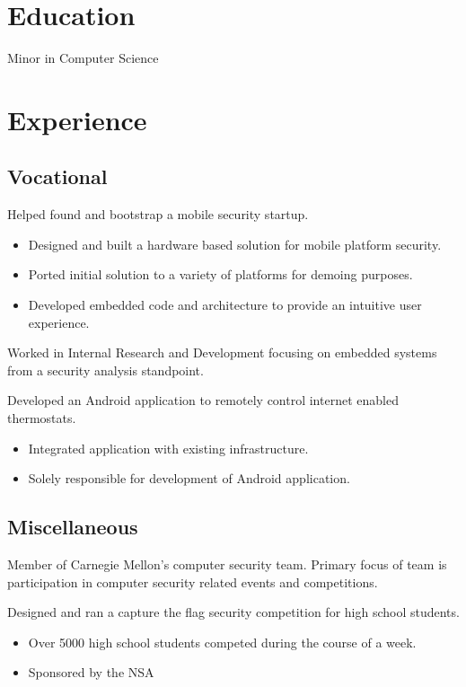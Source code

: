 \documentclass[10pt,a4paper,sans]{moderncv}
\begin{document}
\makecvtitle

\section{Education}
{Minor in Computer Science}

\section{Experience}
\subsection{Vocational}
{Helped found and bootstrap a mobile security startup.
\begin{itemize}
\item Designed and built a hardware based solution for mobile platform security.
\item Ported initial solution to a variety of platforms for demoing purposes.
\item Developed embedded code and architecture to provide an intuitive user experience.
\end{itemize}}

{Worked in Internal Research and Development focusing on embedded systems from a security analysis standpoint.}

{Developed an Android application to remotely control internet enabled thermostats.
\begin{itemize}
\item Integrated application with existing infrastructure.
\item Solely responsible for development of Android application.
\end{itemize}}

\subsection{Miscellaneous}
{Member of Carnegie Mellon's computer security team. Primary focus of team is participation
in computer security related events and competitions.}
{Designed and ran a capture the flag security competition for high school students.
\begin{itemize}
\item Over 5000 high school students competed during the course of a week.
\item Sponsored by the NSA
\end{itemize}}
\end{document}
